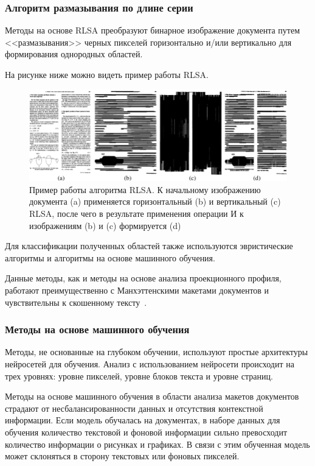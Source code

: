 \newpage

\subsubsection{Алгоритм размазывания по длине серии}

Методы на основе RLSA преобразуют бинарное изображение документа путем <<размазывания>> черных пикселей горизонтально и/или вертикально для формирования однородных областей.

На рисунке ниже можно видеть пример работы RLSA.

\begin{figure}[H]
	\centering
	\includegraphics[width=\textwidth]{img/rlsa.png}
    \caption{Пример работы алгоритма RLSA. К начальному изображению документа (a) применяется горизонтальный (b) и вертикальный (c) RLSA, после чего в результате применения операции И к изображениям (b) и (c) формируется (d)}
	\label{fig:}
\end{figure}

Для классификации полученных областей также используются эвристические алгоритмы и алгоритмы на основе машинного обучения.

Данные методы, как и методы на основе анализа проекционного профиля, работают преимущественно с Манхэттенскими макетами документов и чувствительны к скошенному тексту~\cite{dla-book}.

\subsubsection{Методы на основе машинного обучения}

Методы, не основанные на глубоком обучении, используют простые архитектуры нейросетей для обучения.
Анализ с использованием нейросети происходит на трех уровнях: уровне пикселей, уровне блоков текста и уровне страниц.

Методы на основе машинного обучения в области анализа макетов документов страдают от несбалансированности данных и отсутствия контекстной информации.
Если модель обучалась на документах, в наборе данных для обучения количество текстовой и фоновой информации сильно превосходит количество информации о рисунках и графиках.
В связи с этим обученная модель может склоняться в сторону текстовых или фоновых пикселей.~\cite{dla-survey}


